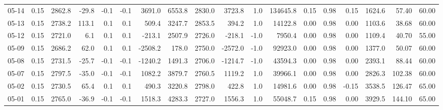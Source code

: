 \begin{threeparttable}
{\begin{tabular}{lrrrrrrrrrrrrrrrrr}
  05-14 &     0.15 & 2862.8 &             -29.8 &              -0.1 &               -0.1 &             3691.0 &  6553.8 & 2830.0 &     3723.8 &                      1.0 &            134645.8 &       0.15 &      0.98 &           0.15 &           1624.6 &           57.40 &                  60.00 \\
  05-13 &     0.15 & 2738.2 &             113.1 &               0.1 &                0.1 &              509.4 &  3247.7 & 2853.5 &      394.2 &                      1.0 &             14122.8 &       0.00 &      0.98 &           0.00 &           1103.6 &           38.68 &                  60.00 \\
  05-12 &     0.15 & 2721.0 &               6.1 &               0.1 &                0.1 &             -213.1 &  2507.9 & 2726.0 &     -218.1 &                     -1.0 &              7950.4 &       0.00 &      0.98 &           0.00 &           1109.4 &           40.70 &                  55.00 \\
  05-09 &     0.15 & 2686.2 &              62.0 &               0.1 &                0.1 &            -2508.2 &   178.0 & 2750.0 &    -2572.0 &                     -1.0 &             92923.0 &       0.00 &      0.98 &           0.00 &           1377.0 &           50.07 &                  60.00 \\
  05-08 &     0.15 & 2731.5 &             -25.7 &              -0.1 &               -0.1 &            -1240.2 &  1491.3 & 2706.0 &    -1214.7 &                     -1.0 &             43594.3 &       0.00 &      0.98 &           0.00 &           2393.1 &           88.44 &                  60.00 \\
  05-07 &     0.15 & 2797.5 &             -35.0 &              -0.1 &               -0.1 &             1082.2 &  3879.7 & 2760.5 &     1119.2 &                      1.0 &             39966.1 &       0.00 &      0.98 &           0.00 &           2826.3 &          102.38 &                  60.00 \\
  05-02 &     0.15 & 2730.5 &              65.4 &               0.1 &                0.1 &              490.3 &  3220.8 & 2798.0 &      422.8 &                      1.0 &             14981.6 &       0.00 &      0.98 &          -0.15 &           3538.5 &          126.47 &                  65.00 \\
  05-01 &     0.15 & 2765.0 &             -36.9 &              -0.1 &               -0.1 &             1518.3 &  4283.3 & 2727.0 &     1556.3 &                      1.0 &             55048.7 &       0.15 &      0.98 &           0.00 &           3929.5 &          144.10 &                  65.00 \\

\end{tabular}}
\end{threeparttable}
